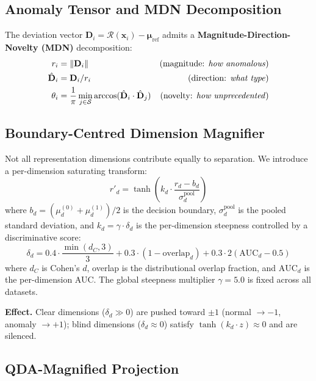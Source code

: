 \documentclass{article}
\newcommand{\Nset}{\mathcal{S}}  %
\newcommand{\calR}{\mathcal{R}}
\newcommand{\norm}[1]{\left\lVert#1\right\rVert}
\begin{document}
\subsection{Anomaly Tensor and MDN Decomposition}

The deviation vector $\mathbf{D}_i = \calR(\mathbf{x}_i) - \bm{\mu}_{\text{ref}}$ admits a \textbf{Magnitude-Direction-Novelty (MDN)} decomposition:
\begin{align}
r_i &= \norm{\mathbf{D}_i} & \text{(magnitude: \emph{how anomalous})} \\
\hat{\mathbf{D}}_i &= \mathbf{D}_i / r_i & \text{(direction: \emph{what type})} \\
\theta_i &= \frac{1}{\pi}\min_{j \in \Nset} \arccos(\hat{\mathbf{D}}_i \cdot \hat{\mathbf{D}}_j) & \text{(novelty: \emph{how unprecedented})}
\end{align}

\subsection{Boundary-Centred Dimension Magnifier}

Not all representation dimensions contribute equally to separation. We introduce a per-dimension saturating transform:
\begin{equation}
r'_d = \tanh\!\left(k_d \cdot \frac{r_d - b_d}{\sigma_d^{\text{pool}}}\right)
\label{eq:magnifier}
\end{equation}
where $b_d = (\mu_d^{(0)} + \mu_d^{(1)})/2$ is the decision boundary, $\sigma_d^{\text{pool}}$ is the pooled standard deviation, and $k_d = \gamma \cdot \delta_d$ is the per-dimension steepness controlled by a discriminative score:
\begin{equation}
\delta_d = 0.4 \cdot \frac{\min(d_C, 3)}{3} + 0.3 \cdot (1 - \text{overlap}_d) + 0.3 \cdot 2(\text{AUC}_d - 0.5)
\end{equation}
where $d_C$ is Cohen's $d$, overlap is the distributional overlap fraction, and $\text{AUC}_d$ is the per-dimension AUC. The global steepness multiplier $\gamma = 5.0$ is fixed across all datasets.

\textbf{Effect.} Clear dimensions ($\delta_d \gg 0$) are pushed toward $\pm 1$ (normal $\to -1$, anomaly $\to +1$); blind dimensions ($\delta_d \approx 0$) satisfy $\tanh(k_d \cdot z) \approx 0$ and are silenced.

\subsection{QDA-Magnified Projection}
\end{document}
